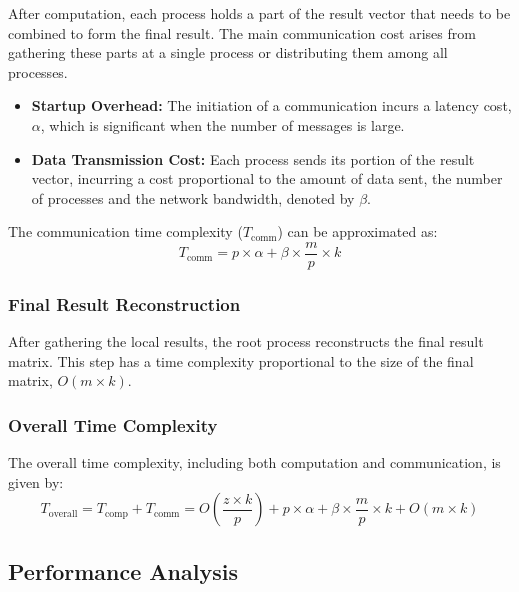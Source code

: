 \documentclass[12pt,oneside]{book} %
\begin{document}
After computation, each process holds a part of the result vector that needs to
be combined to form the final result. The main communication cost arises from
gathering these parts at a single process or distributing them among all
processes.

\begin{itemize}
    \item \textbf{Startup Overhead:} The initiation of a communication incurs a latency cost, \(\alpha\), which is significant when the number of messages is large.
    \item \textbf{Data Transmission Cost:} Each process sends its portion of the result vector, incurring a cost proportional to the amount of data sent, the number of processes and the network bandwidth, denoted by \(\beta\).
\end{itemize}

The communication time complexity (\(T_{\text{comm}}\)) can be approximated as:
\begin{equation}
    T_{\text{comm}} = p \times \alpha + \beta \times \frac{m}{p} \times k
\end{equation}

\subsubsection{Final Result Reconstruction}
After gathering the local results, the root process reconstructs the final
result matrix. This step has a time complexity proportional to the size of the
final matrix, \(O(m \times k)\).

\subsubsection{Overall Time Complexity}
The overall time complexity, including both computation and communication, is
given by:
\begin{equation}
    T_{\text{overall}} = T_{\text{comp}} + T_{\text{comm}} =  O\left(\frac{z \times k}{p}\right) + p \times \alpha + \beta \times \frac{m}{p} \times k + O(m \times k)
\end{equation}

\subsection{Performance Analysis}
\end{document}
